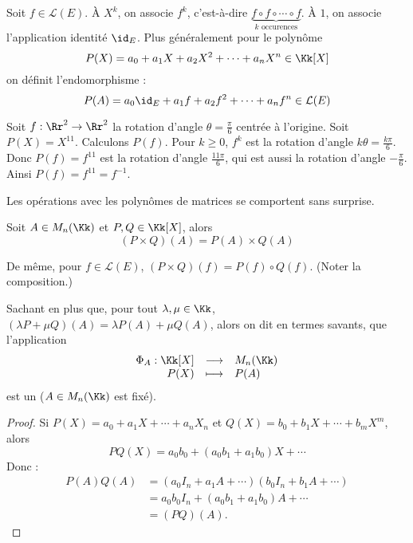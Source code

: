 \documentclass[12pt, class=report,crop=false]{standalone}
\begin{document}
\bigskip


Soit $f \in \mathcal{L}(E)$.
\`A $X^k$, on associe $f^k$, c'est-à-dire $\underbrace{f\circ f \circ \cdots \circ f}_{k \text{ occurences}}$. \`A $1$, on associe l'application identité $\id_E$.
Plus généralement pour le polynôme
\[P(X) = a_0 + a_1 X +a_2 X^2 + \cdots  + a_n X^n \in\Kk[X]\]
on définit l'endomorphisme :
\[P(A) = a_0 \id_E +a_1 f +a_2 f^2 +  \cdots +a_n f^n \in \mathcal{L}(E) \] 

 
\begin{exemple}
Soit $f : \Rr^2 \to \Rr^2$ la rotation d'angle $\theta = \frac{\pi}{6}$ centrée à l'origine.
Soit $P(X) = X^{11}$. Calculons $P(f)$.
Pour $k\ge0$, $f^k$ est la rotation d'angle $k\theta = \frac{k\pi}{6}$.
Donc $P(f) = f^{11}$ est la rotation d'angle $\frac{11\pi}{6}$, qui est aussi la rotation d'angle
$-\frac{\pi}{6}$. Ainsi $P(f) = f^{11} = f^{-1}$.
\end{exemple}


Les opérations avec les polynômes de matrices se comportent sans surprise.
\begin{proposition}
Soit $A \in M_n(\Kk)$ et $P,Q \in \Kk[X]$, alors  
\[(P \times Q)(A) = P(A) \times Q(A)\]
\end{proposition}

De même, pour $f \in \mathcal{L}(E)$, $(P \times Q)(f) = P(f) \circ Q(f)$. (Noter la composition.)

Sachant en plus que, pour tout $\lambda,\mu\in\Kk$, $(\lambda P + \mu Q)(A) = \lambda P(A) +\mu Q(A)$, alors on dit en termes savants,  que l'application 
\[\begin{array}{rcl}
\Phi_A : \Kk[X] & \longrightarrow & M_n(\Kk) \\
P(X) & \longmapsto & P(A)
\end{array}
\]
est un  ($A \in M_n(\Kk)$ est fixé).

\begin{proof}
Si $P(X) = a_0 + a_1X + \cdots + a_nX_n$ et $Q(X) = b_0 + b_1X + \cdots + b_mX^m$, 
alors 
$$PQ(X) = a_0b_0 +(a_0 b_1 + a_1b_0) X + \cdots$$ 
Donc :
\begin{align*}
P(A) Q(A)
  &= (a_0 I_n + a_1 A + \cdots)(b_0 I_n +b_1 A + \cdots) \\
  &= a_0b_0 I_n + (a_0b_1 + a_1b_0) A + \cdots \\  
  &= (PQ)(A) .
\end{align*}
\end{proof}
\end{document}

